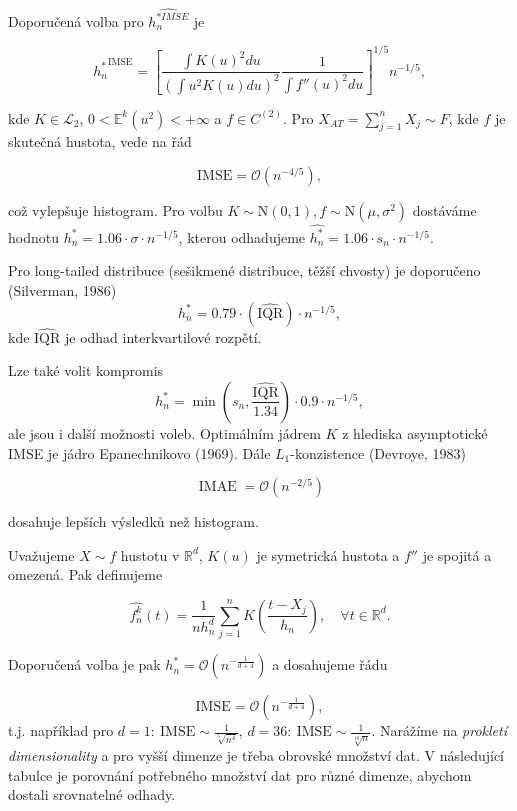 \documentclass{article}
\theoremstyle{remark}
\theoremstyle{plain}
\theoremstyle{definition}
\theoremstyle{remark}
\begin{document}
Doporučená volba pro $\hat{h_n^{*IMSE}}$ je

\begin{equation}
    {h_n^*}^{\text{IMSE}} = \left[ \frac{\int K(u)^2 du}{(\int u^2 K(u)du)^2} \frac{1}{\int f''(u)^2 du} \right]^{1/5} n^{-1/5},
\end{equation}

\smallskip

kde $K \in \mathcal{L}_2$, $0 < \mathbb{E}^k(u^2) < + \infty$ a $f \in C^{(2)}$. \newline Pro $X_{AT} = \sum_{j=1}^n X_j \sim F$, kde $f$ je skutečná hustota, vede na řád

$$
\text{IMSE} = \mathcal{O}(n^{-4/5}),
$$

což vylepšuje histogram. Pro volbu $K \sim \text{N}(0,1), f \sim \text{N}(\mu,\sigma ^2)$ dostáváme hodnotu $h_n^* = 1.06 \cdot \sigma \cdot n^{-1/5}$, kterou odhadujeme $\hat{h_n^*} = 1.06 \cdot s_n \cdot n^{-1/5}$.

Pro long-tailed distribuce (sešikmené distribuce, těžší chvosty) je doporučeno (Silverman, 1986)
$$
h_n^* = 0.79 \cdot (\hat{\text{IQR}}) \cdot n^{-1/5},
$$
kde $\hat{\text{IQR}}$ je odhad interkvartilové rozpětí.

Lze také volit kompromis 
$$
h_n^* = \min \left(s_n ,\frac{\hat{\text{IQR}}}{1.34}\right) \cdot 0.9 \cdot n^{-1/5},
$$
ale jsou i další možnosti voleb. Optimálním jádrem $K$ z hlediska asymptotické IMSE je jádro Epanechnikovo (1969). Dále $L_1$-konzistence (Devroye, 1983)

$$
\operatorname{IMAE} = \mathcal{O}(n^{-2/5})
$$

dosahuje lepších výsledků než histogram.

\bigskip

Uvažujeme $X \sim f$ hustotu v $\mathbb{R}^d$, $K(u)$ je symetrická hustota a $f''$ je spojitá a omezená. Pak definujeme 

$$
\hat{f_n^k}(t) = \frac{1}{n h_n^d} \sum_{j=1}^n K\left(\frac{t-X_j}{h_n}\right), \quad \forall t \in \mathbb{R}^d.
$$

Doporučená volba je pak $h_n^* = \mathcal{O}(n^{-\frac{1}{d+4}})$ a dosahujeme řádu 

$$
\text{IMSE} = \mathcal{O}(n^{-\frac{1}{d+4}}),
$$
t.j. například pro $d=1: \ \text{IMSE} \sim \frac{1}{\sqrt[5]{n^4}}$, $d=36: \ \text{IMSE} \sim \frac{1}{\sqrt[10]{n}}$. Narážíme na \textit{prokletí dimensionality} a pro vyšší dimenze je třeba obrovské množství dat. V následující tabulce je porovnání potřebného množství dat pro různé dimenze, abychom dostali srovnatelné odhady.
\end{document}
